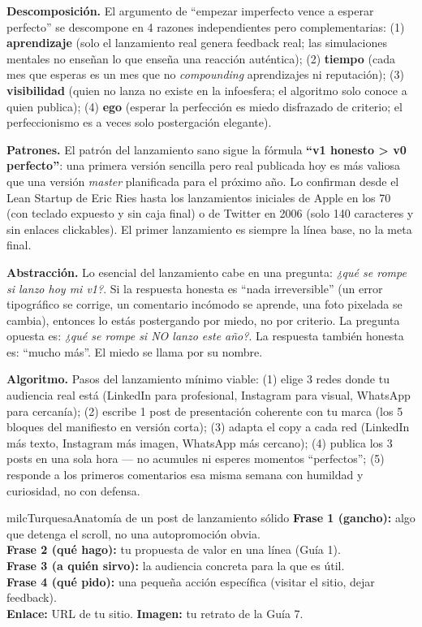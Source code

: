 \documentclass[11pt,letterpaper]{article}
\newcommand{\milcpaso}[3]{%
\Needspace{4\baselineskip}%
\begin{tcolorbox}[enhanced,colback=white,colframe=milcLinea,arc=1.5mm,boxrule=.9pt,
  left=14mm,right=4mm,top=3mm,bottom=3mm,before skip=4pt,after skip=4pt,
  fontupper=\RaggedRight,
  overlay={\node[anchor=north west,circle,fill=#2,text=white,inner sep=0pt,
    minimum size=7.4mm,font=\sffamily\bfseries\small]
    at ([xshift=3.6mm,yshift=-3.2mm]frame.north west) {#1};}]
#3
\end{tcolorbox}}
\begin{document}
\milcpaso{1}{milcTurquesa}{\textbf{Descomposición.} El argumento de ``empezar imperfecto vence a esperar perfecto'' se descompone en 4 razones independientes pero complementarias: (1) \textbf{aprendizaje} (solo el lanzamiento real genera feedback real; las simulaciones mentales no enseñan lo que enseña una reacción auténtica); (2) \textbf{tiempo} (cada mes que esperas es un mes que no \emph{compounding} aprendizajes ni reputación); (3) \textbf{visibilidad} (quien no lanza no existe en la infoesfera; el algoritmo solo conoce a quien publica); (4) \textbf{ego} (esperar la perfección es miedo disfrazado de criterio; el perfeccionismo es a veces solo postergación elegante).}
\milcpaso{2}{milcTurquesa}{\textbf{Patrones.} El patrón del lanzamiento sano sigue la fórmula \textbf{``v1 honesto > v0 perfecto''}: una primera versión sencilla pero real publicada hoy es más valiosa que una versión \emph{master} planificada para el próximo año. Lo confirman desde el Lean Startup de Eric Ries hasta los lanzamientos iniciales de Apple en los 70 (con teclado expuesto y sin caja final) o de Twitter en 2006 (solo 140 caracteres y sin enlaces clickables). El primer lanzamiento es siempre la línea base, no la meta final.}
\milcpaso{3}{milcTurquesa}{\textbf{Abstracción.} Lo esencial del lanzamiento cabe en una pregunta: \emph{¿qué se rompe si lanzo hoy mi v1?}. Si la respuesta honesta es ``nada irreversible'' (un error tipográfico se corrige, un comentario incómodo se aprende, una foto pixelada se cambia), entonces lo estás postergando por miedo, no por criterio. La pregunta opuesta es: \emph{¿qué se rompe si NO lanzo este año?}. La respuesta también honesta es: ``mucho más''. El miedo se llama por su nombre.}
\milcpaso{4}{milcTurquesa}{\textbf{Algoritmo.} Pasos del lanzamiento mínimo viable: (1) elige 3 redes donde tu audiencia real está (LinkedIn para profesional, Instagram para visual, WhatsApp para cercanía); (2) escribe 1 post de presentación coherente con tu marca (los 5 bloques del manifiesto en versión corta); (3) adapta el copy a cada red (LinkedIn más texto, Instagram más imagen, WhatsApp más cercano); (4) publica los 3 posts en una sola hora --- no acumules ni esperes momentos ``perfectos''; (5) responde a los primeros comentarios esa misma semana con humildad y curiosidad, no con defensa.}

\begin{drawbox}{milcTurquesa}{Anatomía de un post de lanzamiento sólido}
\textbf{Frase 1 (gancho):} algo que detenga el scroll, no una autopromoción obvia. \\[1mm] \textbf{Frase 2 (qué hago):} tu propuesta de valor en una línea (Guía 1). \\[1mm] \textbf{Frase 3 (a quién sirvo):} la audiencia concreta para la que es útil. \\[1mm] \textbf{Frase 4 (qué pido):} una pequeña acción específica (visitar el sitio, dejar feedback). \\[1mm] \textbf{Enlace:} URL de tu sitio. \textbf{Imagen:} tu retrato de la Guía 7.
\end{drawbox}
\end{document}
